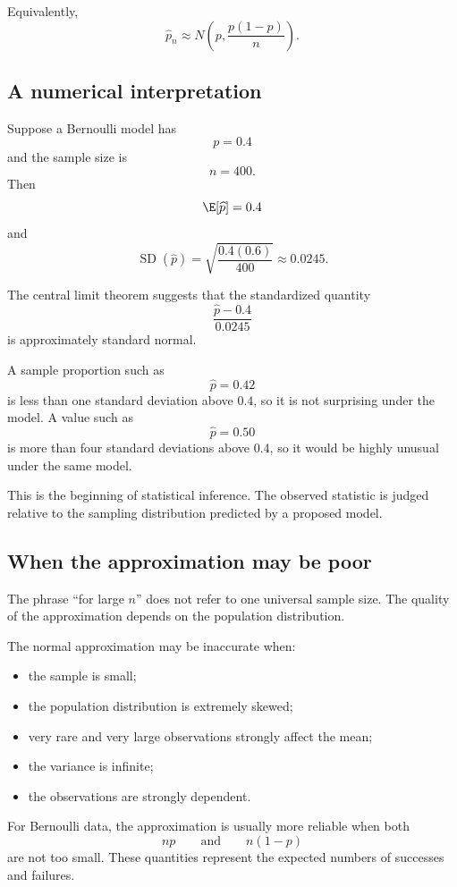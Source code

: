 Equivalently,
\[
\widehat p_n
\approx
N\left(p,\frac{p(1-p)}{n}\right).
\]

\subsection*{A numerical interpretation}

Suppose a Bernoulli model has
\[
p=0.4
\]
and the sample size is
\[
n=400.
\]
Then
\[
\E[\widehat p]=0.4
\]
and
\[
\operatorname{SD}(\widehat p)
=
\sqrt{\frac{0.4(0.6)}{400}}
\approx 0.0245.
\]

The central limit theorem suggests that the standardized quantity
\[
\frac{\widehat p-0.4}{0.0245}
\]
is approximately standard normal.

A sample proportion such as
\[
\widehat p=0.42
\]
is less than one standard deviation above \(0.4\), so it is not surprising under
the model. A value such as
\[
\widehat p=0.50
\]
is more than four standard deviations above \(0.4\), so it would be highly
unusual under the same model.

This is the beginning of statistical inference. The observed statistic is judged
relative to the sampling distribution predicted by a proposed model.

\subsection*{When the approximation may be poor}

The phrase ``for large \(n\)'' does not refer to one universal sample size. The
quality of the approximation depends on the population distribution.

The normal approximation may be inaccurate when:

\begin{itemize}
    \item the sample is small;
    \item the population distribution is extremely skewed;
    \item very rare and very large observations strongly affect the mean;
    \item the variance is infinite;
    \item the observations are strongly dependent.
\end{itemize}

For Bernoulli data, the approximation is usually more reliable when both
\[
np
\qquad\text{and}\qquad
n(1-p)
\]
are not too small. These quantities represent the expected numbers of successes
and failures.


